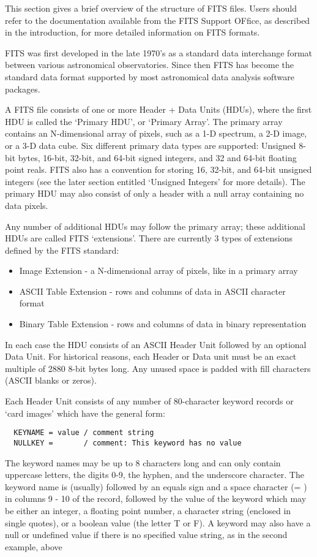 \documentclass[11pt]{book}
\begin{document}
This section gives a brief overview of the structure of FITS files.
Users should refer to the documentation available from the FITS Support OFfice,
as described in the introduction, for more detailed information on FITS
formats.

FITS was first developed in the late 1970's as a standard data
interchange format between various astronomical observatories.  Since
then FITS has become the standard data format supported by most
astronomical data analysis software packages.

A FITS file consists of one or more Header + Data Units (HDUs), where
the first HDU is called the `Primary HDU', or `Primary Array'.  The
primary array contains an N-dimensional array of pixels, such as a 1-D
spectrum, a 2-D image, or a 3-D data cube.  Six different primary
data types are supported: Unsigned 8-bit bytes, 16-bit, 32-bit, and 64-bit signed
integers, and 32 and 64-bit floating point reals.  FITS also has a
convention for storing 16, 32-bit, and 64-bit unsigned integers (see the later
section entitled `Unsigned Integers' for more details). The primary HDU
may also consist of only a header with a null array containing no
data pixels.

Any number of additional HDUs may follow the primary array; these
additional HDUs are called FITS `extensions'.  There are currently 3
types of extensions defined by the FITS standard:

\begin{itemize}
\item
  Image Extension - a N-dimensional array of pixels, like in a primary array
\item
  ASCII Table Extension - rows and columns of data in ASCII character format
\item
  Binary Table Extension - rows and columns of data in binary representation
\end{itemize}

In each case the HDU consists of an ASCII Header Unit followed by an optional
Data Unit.  For historical reasons, each Header or Data unit must be an
exact multiple of 2880 8-bit bytes long.  Any unused space is padded
with fill characters (ASCII blanks or zeros).

Each Header Unit consists of any number of 80-character keyword records
or `card images' which have the
general form:

\begin{verbatim}
  KEYNAME = value / comment string
  NULLKEY =       / comment: This keyword has no value
\end{verbatim}
The keyword names may be up to 8 characters long and can only contain
uppercase letters, the digits 0-9, the hyphen, and the underscore
character. The keyword name is (usually) followed by an equals sign and
a space character (= ) in columns 9 - 10 of the record, followed by the
value of the keyword which may be either an integer, a floating point
number, a character string (enclosed in single quotes), or a boolean
value (the letter T or F).   A keyword may also have a null or undefined
value if there is no specified value string, as in the second example, above
\end{document}

